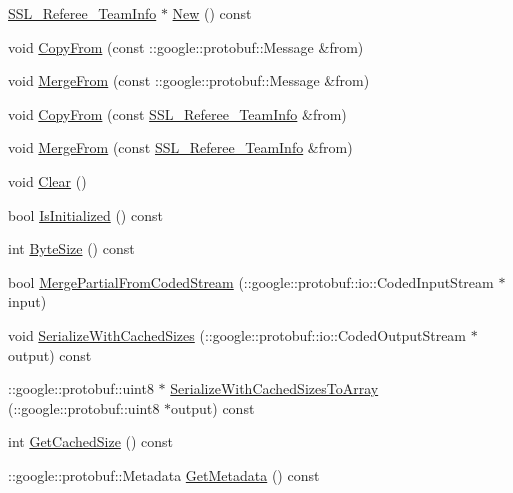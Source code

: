 \begin{DoxyCompactItemize}
\hyperlink{class_s_s_l___referee___team_info}{S\-S\-L\-\_\-\-Referee\-\_\-\-Team\-Info} $\ast$ \hyperlink{class_s_s_l___referee___team_info_ae3d79f01a7e2103bd6a90a852143be7c}{New} () const 
\item 
void \hyperlink{class_s_s_l___referee___team_info_ae93f07ff5c46cd76cae2f5195234c31a}{Copy\-From} (const \-::google\-::protobuf\-::\-Message \&from)
\item 
void \hyperlink{class_s_s_l___referee___team_info_abce923f4c044d0e299a0832c56c927d9}{Merge\-From} (const \-::google\-::protobuf\-::\-Message \&from)
\item 
void \hyperlink{class_s_s_l___referee___team_info_ad0aafd7902ec717c126579fae6e60431}{Copy\-From} (const \hyperlink{class_s_s_l___referee___team_info}{S\-S\-L\-\_\-\-Referee\-\_\-\-Team\-Info} \&from)
\item 
void \hyperlink{class_s_s_l___referee___team_info_af0c508b4bb73381049033ad1f593f8cf}{Merge\-From} (const \hyperlink{class_s_s_l___referee___team_info}{S\-S\-L\-\_\-\-Referee\-\_\-\-Team\-Info} \&from)
\item 
void \hyperlink{class_s_s_l___referee___team_info_ab8e882464a6df427737ce78f1ea2d718}{Clear} ()
\item 
bool \hyperlink{class_s_s_l___referee___team_info_a53e3c7e8cb32623c606e60d1e90ac1a3}{Is\-Initialized} () const 
\item 
int \hyperlink{class_s_s_l___referee___team_info_a0ebd2fe381ead323fde721c3e05f0e22}{Byte\-Size} () const 
\item 
bool \hyperlink{class_s_s_l___referee___team_info_a4fd30e5217f37c9ebe068c7495baa28f}{Merge\-Partial\-From\-Coded\-Stream} (\-::google\-::protobuf\-::io\-::\-Coded\-Input\-Stream $\ast$input)
\item 
void \hyperlink{class_s_s_l___referee___team_info_a7eecddb389850b7b60a56d57016bedc6}{Serialize\-With\-Cached\-Sizes} (\-::google\-::protobuf\-::io\-::\-Coded\-Output\-Stream $\ast$output) const 
\item 
\-::google\-::protobuf\-::uint8 $\ast$ \hyperlink{class_s_s_l___referee___team_info_a9e10b80ec23e4989dbf764e9a80a3421}{Serialize\-With\-Cached\-Sizes\-To\-Array} (\-::google\-::protobuf\-::uint8 $\ast$output) const 
\item 
int \hyperlink{class_s_s_l___referee___team_info_aab52ab9bfaf5dffafafbb82c64769936}{Get\-Cached\-Size} () const 
\item 
\-::google\-::protobuf\-::\-Metadata \hyperlink{class_s_s_l___referee___team_info_ac70dffcedbe2eedb17ffe71cbf1416c7}{Get\-Metadata} () const 

\end{DoxyCompactItemize}
